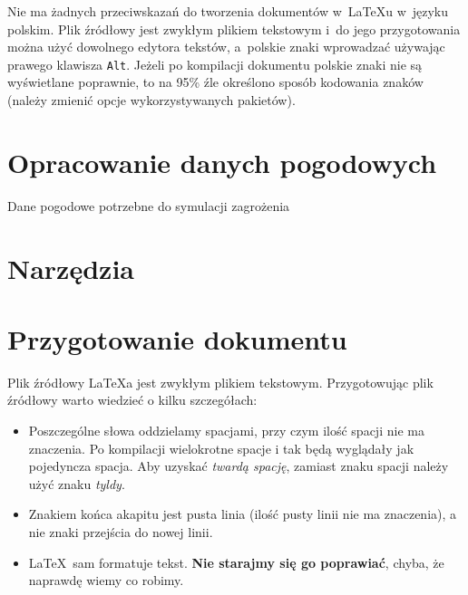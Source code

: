 Nie ma żadnych przeciwskazań do tworzenia dokumentów w~\LaTeX u w~języku polskim. Plik źródłowy jest zwykłym plikiem tekstowym i~do jego przygotowania można użyć dowolnego edytora tekstów, a~polskie znaki wprowadzać używając prawego klawisza \texttt{Alt}. Jeżeli po kompilacji dokumentu polskie znaki nie są wyświetlane poprawnie, to na 95\% źle określono sposób kodowania znaków (należy zmienić opcje wykorzystywanych pakietów).



\section{Opracowanie danych pogodowych}
\label{sec:kompilacja}


Dane pogodowe potrzebne do symulacji zagrożenia 




\section{Narzędzia}
\label{sec:narzedzia}



\section{Przygotowanie dokumentu}
\label{sec:przygotowanieDokumentu}

Plik źródłowy \LaTeX a jest zwykłym plikiem tekstowym. Przygotowując plik
źródłowy warto wiedzieć o kilku szczegółach:

\begin{itemize}
\item
Poszczególne słowa oddzielamy spacjami, przy czym ilość spacji nie ma znaczenia.
Po kompilacji wielokrotne spacje i tak będą wyglądały jak pojedyncza spacja.
Aby uzyskać {\em twardą spację}, zamiast znaku spacji należy użyć znaku {\em
tyldy}.

\item
Znakiem końca akapitu jest pusta linia (ilość pusty linii nie ma znaczenia), a
nie znaki przejścia do nowej linii.

\item
\LaTeX~sam formatuje tekst. \textbf{Nie starajmy się go poprawiać}, chyba, że
naprawdę wiemy co robimy.
\end{itemize} 


